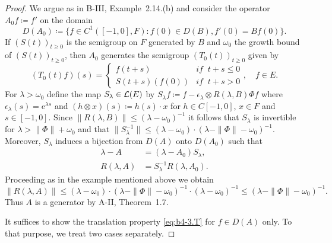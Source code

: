 \begin{proof} We argue as in B-III, Example~2.14.(b) and consider the operator $A_{0}f  \coloneq  f'$ on the domain 
\[
D(A_{0})  \coloneq  \{f \in C^1([-1,0],F) \colon f(0) \in D(B), f'(0) = Bf(0)\} .
\]
If $(S(t))_{t\geq 0}$ is the semigroup on $F$ generated by $B$ and $\omega_0$ the growth bound of $(S(t))_{t\geq 0}$, then $A_{0}$ generates the semigroup $(T_{0}(t))_{t\geq 0}$ given by
\[
(T_{0}(t)f)(s) = \begin{cases}
	f(t+s) & \textit{if } \ t+s \leq 0 \\
	S(t+s)(f(0)) & \textit{if } \ t+s  >  0
\end{cases}, \quad f \in E .
\]
For $\lambda  >  \omega_0$ define the map $S_{\lambda} \in \mathcal{L}(E)$ by $S_{\lambda}f  \coloneq  f - \epsilon_{\lambda}\otimes R(\lambda,B)\Phi f$ where $\epsilon_{\lambda}(s) = \mathrm{e}^{\lambda s}$ and $(h\otimes x)(s)  \coloneq  h(s)\cdot x$ for $h \in C[-1,0]$, $x \in F$ and $s \in [-1,0]$.
Since $\|R(\lambda,B)\| \leq (\lambda-\omega_0)^{-1}$ it follows that $S_{\lambda}$ is invertible for $\lambda  >  \|\Phi\| + \omega_0$ and that $\|S_{\lambda}^{-1}\| \leq (\lambda-\omega_0)\cdot(\lambda-\|\Phi\|-\omega_0)^{-1}$.
Moreover, $S_{\lambda}$ induces a bijection from $D(A)$ onto $D(A_{0})$ such that
\begin{equation}\label{eq:b4-3.2}
	\begin{aligned}
		\lambda - A &= (\lambda - A_{0})S_{\lambda} , \\
		R(\lambda,A) &= S_{\lambda}^{-1}R(\lambda,A_{0}) .
	\end{aligned}
\end{equation}
Proceeding as in the example mentioned above we obtain
\[\|R(\lambda,A)\| \leq (\lambda - \omega_0)\cdot(\lambda - \|\Phi\| - \omega_0)^{-1}\cdot(\lambda - \omega_0)^{-1} \leq (\lambda - \|\Phi\| - \omega_0)^{-1}.\]
Thus $A$ is a generator by A-II, Theorem~1.7.

It suffices to show the translation property \eqref{eq:b4-3.T} for $f \in D(A)$ only.
To that purpose, we treat two cases separately.


\end{proof}
